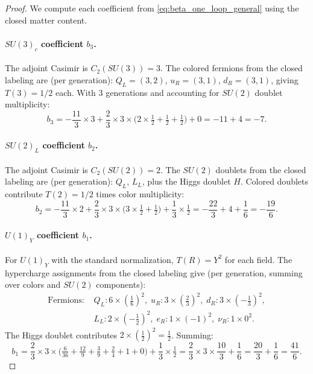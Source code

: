 \begin{proof}
We compute each coefficient from \eqref{eq:beta_one_loop_general} using the closed matter content.

\paragraph{$SU(3)_c$ coefficient $b_3$.}
The adjoint Casimir is $C_2(SU(3))=3$.
The colored fermions from the closed labeling are (per generation): $Q_L=(3,2)$, $u_R=(3,1)$, $d_R=(3,1)$, giving $T(3)=1/2$ each.
With 3 generations and accounting for $SU(2)$ doublet multiplicity:
\[
b_3 = -\frac{11}{3}\times 3 + \frac{2}{3}\times 3\times\bigl(2\times\tfrac{1}{2} + \tfrac{1}{2} + \tfrac{1}{2}\bigr) + 0 = -11 + 4 = -7.
\]

\paragraph{$SU(2)_L$ coefficient $b_2$.}
The adjoint Casimir is $C_2(SU(2))=2$.
The $SU(2)$ doublets from the closed labeling are (per generation): $Q_L$, $L_L$, plus the Higgs doublet $H$.
Colored doublets contribute $T(2)=1/2$ times color multiplicity:
\[
b_2 = -\frac{11}{3}\times 2 + \frac{2}{3}\times 3\times\bigl(3\times\tfrac{1}{2} + \tfrac{1}{2}\bigr) + \frac{1}{3}\times\tfrac{1}{2}
= -\frac{22}{3} + 4 + \frac{1}{6} = -\frac{19}{6}.
\]

\paragraph{$U(1)_Y$ coefficient $b_1$.}
For $U(1)_Y$ with the standard normalization, $T(R)=Y^2$ for each field.
The hypercharge assignments from the closed labeling give (per generation, summing over colors and $SU(2)$ components):
\begin{align*}
\text{Fermions: } & Q_L: 6\times(\tfrac{1}{6})^2,\; u_R: 3\times(\tfrac{2}{3})^2,\; d_R: 3\times(-\tfrac{1}{3})^2, \\
& L_L: 2\times(-\tfrac{1}{2})^2,\; e_R: 1\times(-1)^2,\; \nu_R: 1\times 0^2.
\end{align*}
The Higgs doublet contributes $2\times(\tfrac{1}{2})^2=\tfrac{1}{2}$.
Summing:
\[
b_1 = \frac{2}{3}\times 3\times\bigl(\tfrac{6}{36}+\tfrac{12}{9}+\tfrac{3}{9}+\tfrac{2}{4}+1+0\bigr) + \frac{1}{3}\times\tfrac{1}{2}
= \frac{2}{3}\times 3\times\frac{10}{3} + \frac{1}{6} = \frac{20}{3} + \frac{1}{6} = \frac{41}{6}.
\]
\end{proof}

